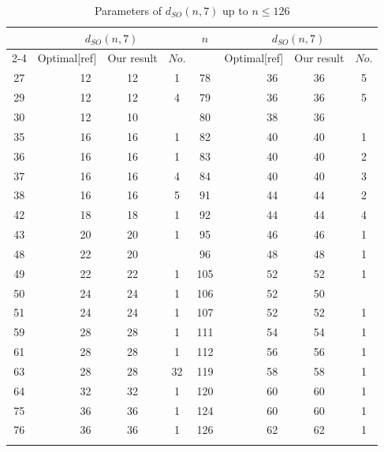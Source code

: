 \documentclass{article}
\theoremstyle{definition}
\theoremstyle{remark}
\begin{document}
\begin{table}[ht]
\centering
\caption{Parameters of $d_{SO}(n, 7)$ up to $n\le 126$}
\label{tab:my_table_7col}
\small
\begin{tabular}{c|r|c|c|c|r|c|c}
\Xhline{2\arrayrulewidth}
\multirow{2}{*}{$n$} & \multicolumn{3}{c|}{$d_{SO}(n, 7)$} & \multirow{2}{*}{$n$} & \multicolumn{3}{c}{$d_{SO}(n, 7)$} \\
\cline{2-4} \cline{6-8}
 & Optimal[ref] & Our result & $No.$ &  & Optimal[ref] & Our result & $No.$  \\
\Xhline{2\arrayrulewidth}
27 & 12~\cite{Bouyukliev2006} & 12 & 1 & 78 & 36~\cite{Shi2025} & 36 & 5 \\\hline
29 & 12~\cite{Bouyukliev2006} & 12 & 4 & 79 & 36~\cite{Shi2025} & 36 & 5 \\\hline
30 & 12~\cite{Bouyukliev2006} & 10 & & 80 & 38~\cite{Shi2025} & 36 & \\\hline
35 & 16~\cite{Bouyukliev2006} & 16 & 1 & 82 & 40~\cite{Shi2025} & 40 & 1 \\\hline
36 & 16~\cite{Bouyukliev2006} & 16 & 1 & 83 & 40~\cite{Shi2025} & 40 & 2 \\\hline
37 & 16~\cite{Bouyukliev2006} & 16 & 4 & 84 & 40~\cite{Shi2025} & 40 & 3 \\\hline
38 & 16~\cite{Bouyukliev2006} & 16 & 5 & 91 & 44~\cite{Shi2025} & 44 & 2 \\\hline
42 & 18~\cite{Shi2025} & 18 & 1 & 92 & 44~\cite{Shi2025} & 44 & 4 \\\hline
43 & 20~\cite{Shi2025} & 20 & 1 & 95 & 46~\cite{Shi2025} & 46 & 1 \\\hline
48 & 22~\cite{Shi2025} & 20 & & 96 & 48~\cite{Shi2025} & 48 & 1 \\\hline
49 & 22~\cite{Shi2025} & 22 & 1 & 105 & 52~\cite{Shi2025} & 52 & 1 \\\hline
50 & 24~\cite{Shi2025} & 24 & 1 & 106 & 52~\cite{Shi2025} & 50 & \\\hline
51 & 24~\cite{Shi2025} & 24 & 1 & 107 & 52~\cite{Shi2025} & 52 & 1 \\\hline
59 & 28~\cite{Shi2025} & 28 & 1 & 111 & 54~\cite{Shi2025} & 54 & 1 \\\hline
61 & 28~\cite{Shi2025} & 28 & 1 & 112 & 56~\cite{Shi2025} & 56 & 1 \\\hline
63 & 28~\cite{Shi2025} & 28 & 32 & 119 & 58~\cite{Shi2025} & 58 & 1 \\\hline
64 & 32~\cite{Shi2025} & 32 & 1 & 120 & 60~\cite{Shi2025} & 60 & 1 \\\hline
75 & 36~\cite{Shi2025} & 36 & 1 & 124 & 60~\cite{Shi2025} & 60 & 1 \\\hline
76 & 36~\cite{Shi2025} & 36 & 1 & 126 & 62~\cite{Shi2025} & 62 & 1 \\
\Xhline{2\arrayrulewidth}
\end{tabular}
\end{table}
\end{document}
